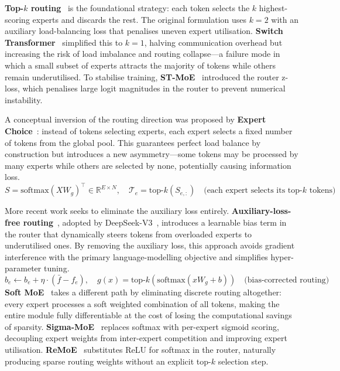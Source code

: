 \textbf{Top-$k$ routing}~\cite{shazeer2017outrageously} is the foundational strategy: each token selects the $k$ highest-scoring experts and discards the rest.
The original formulation uses $k{=}2$ with an auxiliary load-balancing loss that penalises uneven expert utilisation.
\textbf{Switch Transformer}~\cite{fedus2022switch} simplified this to $k{=}1$, halving communication overhead but increasing the risk of load imbalance and routing collapse---a failure mode in which a small subset of experts attracts the majority of tokens while others remain underutilised.
To stabilise training, \textbf{ST-MoE}~\cite{zoph2022stmoe} introduced the router z-loss, which penalises large logit magnitudes in the router to prevent numerical instability.

A conceptual inversion of the routing direction was proposed by \textbf{Expert Choice}~\cite{zhou2022mixture}: instead of tokens selecting experts, each expert selects a fixed number of tokens from the global pool.
This guarantees perfect load balance by construction but introduces a new asymmetry---some tokens may be processed by many experts while others are selected by none, potentially causing information loss.
\begin{equation}
S = \mathrm{softmax}(X W_g)^\top \in \mathbb{R}^{E \times N}, \quad \mathcal{T}_e = \mathrm{top\text{-}}k\!\left(S_{e,:}\right) \quad \text{(each expert selects its top-}k\text{ tokens)}
\label{eq:expert_choice}
\end{equation}

More recent work seeks to eliminate the auxiliary loss entirely.
\textbf{Auxiliary-loss-free routing}~\cite{wang2024auxiliary}, adopted by DeepSeek-V3~\cite{liu2024deepseek}, introduces a learnable bias term in the router that dynamically steers tokens from overloaded experts to underutilised ones.
By removing the auxiliary loss, this approach avoids gradient interference with the primary language-modelling objective and simplifies hyper-parameter tuning.
\begin{equation}
b_e \leftarrow b_e + \eta \cdot (\bar{f} - f_e), \quad g(x) = \mathrm{top\text{-}}k\!\left(\mathrm{softmax}(x W_g + b)\right) \quad \text{(bias-corrected routing)}
\label{eq:auxfree}
\end{equation}
\textbf{Soft MoE}~\cite{puigcerver2024soft} takes a different path by eliminating discrete routing altogether: every expert processes a soft weighted combination of all tokens, making the entire module fully differentiable at the cost of losing the computational savings of sparsity.
\textbf{Sigma-MoE}~\cite{hu2024sigma} replaces softmax with per-expert sigmoid scoring, decoupling expert weights from inter-expert competition and improving expert utilisation.
\textbf{ReMoE}~\cite{wang2024remoe} substitutes ReLU for softmax in the router, naturally producing sparse routing weights without an explicit top-$k$ selection step.

